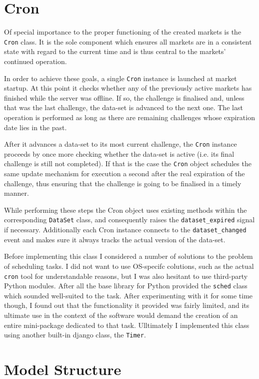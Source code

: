 \documentclass[bsc,frontabs,twoside,singlespacing,parskip,deptreport]{infthesis}     %
\begin{document}
\section{Cron}

	Of special importance to the proper functioning of the created markets is the {\tt Cron} class. It is the sole component which ensures all markets are in a consistent state with regard to the current time and is thus central to the markets' continued operation. 

	In order to achieve these goals, a single {\tt Cron} instance is launched at market startup. At this point it checks whether any of the previously active markets has finished while the server was offline. If so, the challenge is finalised and, unless that was the last challenge, the data-set is advanced to the next one. The last operation is performed as long as there are remaining challenges whose expiration date lies in the past. 

	After it advances a data-set to its most current challenge, the {\tt Cron} instance proceeds by once more checking whether the data-set is active (i.e. its final challenge is still not completed). If that is the case the {\tt Cron} object schedules the same update mechanism for execution a second after the real expiration of the challenge, thus ensuring that the challenge is going to be finalised in a timely manner. 
	
	While performing these steps the Cron object uses existing methods within the corresponding {\tt DataSet} class, and consequently raises the {\tt dataset\_expired} signal if necessary. Additionally each Cron instance connects to the {\tt dataset\_changed} event and makes sure it always tracks the actual version of the data-set. 

	Before implementing this class I considered a number of solutions to the problem of scheduling tasks. I did not want to use OS-specifc colutions, such as the actual {\tt cron} tool for understandable reasons, but I was also hesitant to use third-party Python modules. After all the base library for Python provided the {\tt sched} class which sounded well-suited to the task. After experimenting with it for some time though, I found out that the functionality it provided was fairly limited, and its ultimate use in the context of the software would demand the creation of an entire mini-package dedicated to that task. Ulltimately I implemented this class using another built-in django class, the {\tt Timer}. 

\section{Model Structure}
\end{document}
